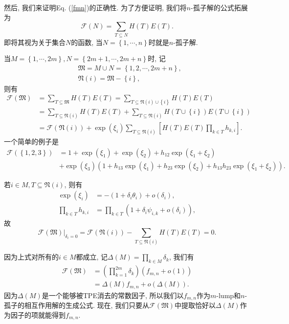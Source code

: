 \documentclass[12pt,a4paper,UTF8]{article}
\numberwithin{equation}{section}
\newcommand{\sbrace}[1]{\left(#1\right)}
\newcommand{\mbrace}[1]{\left[#1\right]}
\newcommand{\bbrace}[1]{\left\{#1\right\}}
\newcommand{\eval}[2]{\left.{#1}\right|_{#2}}
\newcommand{\FM}{\mathfrak{M}}
\newcommand{\FN}{\mathfrak{N}}
\newcommand{\CF}{\mathcal{F}}
\newcommand{\refeqn}[1]{Eq. (\ref{#1})}
\newcommand{\MLNS}{$m$-lump和$n$-孤子的相互作用解}
\begin{document}
然后, 我们来证明\refeqn{fmn}的正确性. 为了方便证明, 我们将$n$-孤子解的公式拓展为
\begin{equation}
  \CF(N)=\sum_{T\subseteq N}{H(T)E(T)}.
\end{equation}
即将其视为关于集合$N$的函数, 当$N=\bbrace{1,\cdots,n}$时就是$n$-孤子解. 

当$M=\bbrace{1,\cdots,2m},N=\bbrace{2m+1,\cdots,2m+n}$时, 记
\begin{equation}
\begin{aligned}
  &\FM=M\cup N = \bbrace{1,2,\cdots,2m+n}, \\ 
  &\FN(i)=\FM - \bbrace{i},
\end{aligned}
\end{equation}
则有
\begin{equation}
\begin{aligned}
  \CF(\FM)&=\sum_{T\subseteq \FM}{H(T)E(T)}=\sum_{T\subseteq \FN(i)\cup \bbrace{i}}{H(T)E(T)} \\
  &=\sum_{T\subseteq \FN(i)}{H(T)E(T)}+\sum_{T\subseteq \FN(i)}{H(T\cup \bbrace{i})E(T\cup \bbrace{i})} \\ 
  &=\CF(\FN(i))+\exp(\xi_i)\sum_{T\subseteq \FN(i)}\mbrace{H(T)E(T)\prod_{k\in T}{h_{k,i}}}. 
\end{aligned}
\end{equation}
一个简单的例子是
\begin{equation}
\begin{aligned}
\CF(\bbrace{1,2,3})&=1+\exp(\xi_1)+\exp(\xi_2)+h_{12}\exp(\xi_1+\xi_2)  \\ 
&+\exp(\xi_3)\sbrace{1+h_{13}\exp(\xi_1)+h_{23}\exp(\xi_2)+h_{13}h_{23}\exp(\xi_1+\xi_2)}.
\end{aligned}
\end{equation}

若$i\in M,T\subseteq \FN(i)$, 则有
\begin{equation}
\begin{aligned}
  \exp(\xi_i)&=-(1+\delta_i \theta_i)+o(\delta_i), \\ 
  \prod_{k\in T}{h_{k,i}}&=\prod_{k\in T}\sbrace{1+\delta_i \psi_{i,k}+o(\delta_i)} ,
\end{aligned}
\end{equation}
故
\begin{equation}
  \eval{\CF(\FM)}{\delta_i=0}=\CF(\FN(i))-\sum_{T\subseteq \FN(i)}{H(T)E(T)}=0. 
\end{equation}

因为上式对所有的$i\in M$都成立, 记$\Delta(M)=\prod_{k\in M}{\delta_k}$, 我们有
\begin{equation}
\begin{aligned}
  \CF(\FM)&=\sbrace{\prod_{k=1}^{2m}{\delta_k}}\sbrace{f_{m,n}+o(1)}\\
  &=\Delta(M)f_{m,n}+o\sbrace{\Delta(M)}. 
\end{aligned}
\label{fmn-o}
\end{equation}
因为$\Delta(M)$是一个能够被TPE消去的常数因子, 所以我们以$f_{m,n}$作为\MLNS{}的生成公式. 现在, 我们只要从$\CF(\FM)$中提取恰好以$\Delta(M)$作为因子的项就能得到$f_{m,n}$.
\end{document}
